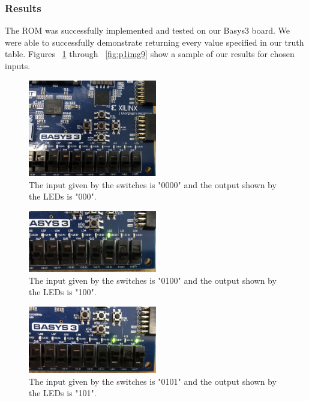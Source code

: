 \documentclass[11pt]{article}
\begin{document}
\subsubsection{Results}
The ROM was successfully implemented and tested on our Basys3 board. We were able to successfully demonstrate returning every value specified in our truth table. Figures ~\ref{fig:p1img1} through ~\ref{fig:p1img9} show a sample of our results for chosen inputs.

\begin{figure}[H]
\begin{center}
	\includegraphics[width=0.5\textwidth]{../report-images/Part1/IMG_3076.jpg}
	\caption{\label{fig:p1img1}The input given by the switches is "0000" and the output shown by the LEDs is "000".}
\end{center}
\end{figure}

\begin{figure}[H]
\begin{center}
	\includegraphics[width=0.5\textwidth]{../report-images/Part1/IMG_3081.jpg}
	\caption{\label{fig:p1img2}The input given by the switches is "0100" and the output shown by the LEDs is "100".}
\end{center}
\end{figure}

\begin{figure}[H]
\begin{center}
	\includegraphics[width=0.5\textwidth]{../report-images/Part1/IMG_3082.jpg}
	\caption{\label{fig:p1img3}The input given by the switches is "0101" and the output shown by the LEDs is "101".}
\end{center}
\end{figure}
\end{document}
